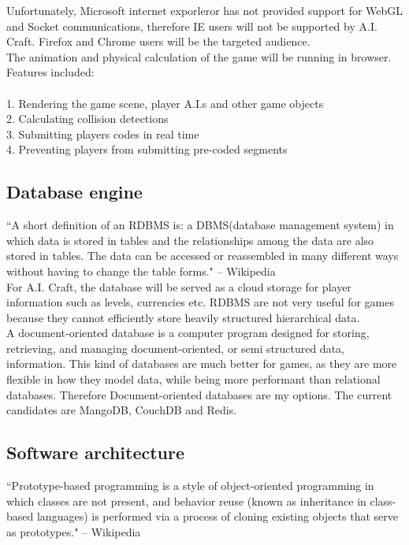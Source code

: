 \documentclass[12pt]{article}
\begin{document}
Unfortunately, Microsoft internet exporleror has not provided support for WebGL and Socket communications, therefore IE users will not be supported by A.I. Craft. Firefox and Chrome users will be the targeted audience.\\


The animation and physical calculation of the game will be running in browser. Features included:\\
\\
1. Rendering the game scene, player A.I.s and other game objects\\
2. Calculating collision detections\\
3. Submitting players codes in real time\\
4. Preventing players from submitting pre-coded segments\\

\subsection{Database engine}
``A short definition of an RDBMS is: a DBMS(database management system) in which data is stored in tables and the relationships among the data are also stored in tables. The data can be accessed or reassembled in many different ways without having to change the table forms." -- Wikipedia\\

For A.I. Craft, the database will be served as a cloud storage for player information such as levels, currencies etc. RDBMS are not very useful for games because they cannot efficiently store heavily structured hierarchical data\cite{ari}.\\ 

A document-oriented database is a computer program designed for storing, retrieving, and managing document-oriented, or semi structured data, information. This kind of databases are much better for games, as they are more flexible in how they model data, while being more performant than relational databases\cite{michael10}. Therefore Document-oriented databases are my options. The current candidates are MangoDB, CouchDB and Redis.\\

\subsection{Software architecture}

``Prototype-based programming is a style of object-oriented programming in which classes are not present, and behavior reuse (known as inheritance in class-based languages) is performed via a process of cloning existing objects that serve as prototypes." -- Wikipedia\\
\end{document}

